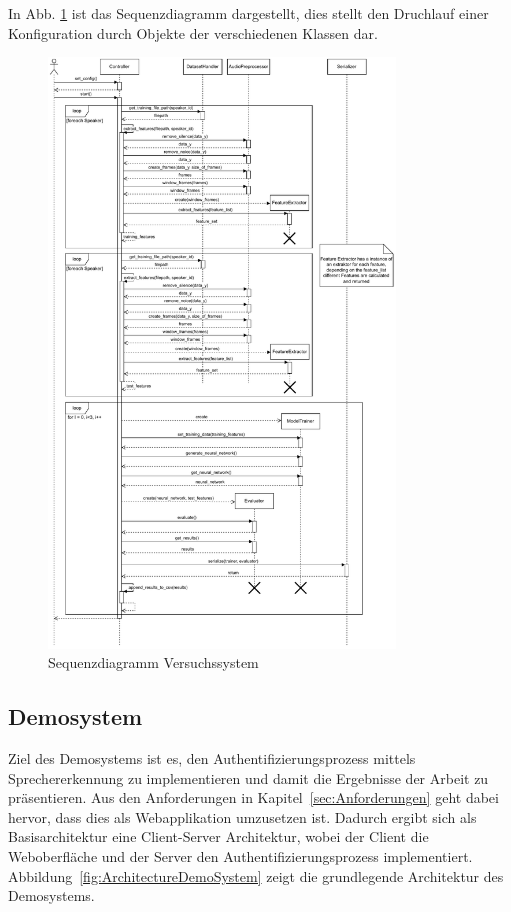 In Abb. \ref{fig:sequenzdiagramm-versuchssystem} ist das Sequenzdiagramm dargestellt, dies stellt den Druchlauf einer Konfiguration durch Objekte der verschiedenen Klassen dar.
\begin{figure}[H]
    \centering
    \includegraphics[width=0.82\textwidth, keepaspectratio]{images/versuchssytem_sequenzdiagramm.pdf}
    \caption{Sequenzdiagramm Versuchssystem}
    \label{fig:sequenzdiagramm-versuchssystem}
\end{figure}\noindent





\subsection{Demosystem}
Ziel des Demosystems ist es, den Authentifizierungsprozess mittels Sprechererkennung zu implementieren und damit die Ergebnisse der Arbeit zu präsentieren.
Aus den Anforderungen in Kapitel~\ref{sec:Anforderungen} geht dabei hervor, dass dies als Webapplikation umzusetzen ist.
Dadurch ergibt sich als Basisarchitektur eine Client-Server Architektur, wobei der Client die Weboberfläche und der Server den Authentifizierungsprozess implementiert.
Abbildung~\ref{fig:ArchitectureDemoSystem} zeigt die grundlegende Architektur des Demosystems.

